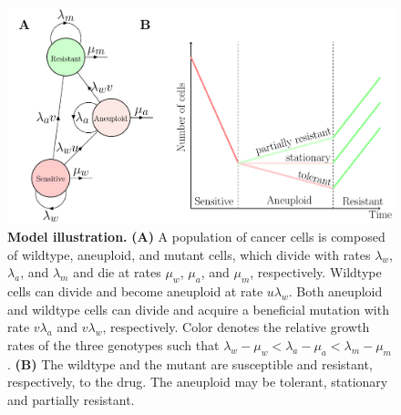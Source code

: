 \documentclass[12pt]{extarticle}
\begin{document}

\begin{figure}
\centering
\includegraphics[width=\textwidth]{Figures/figureAneuploidy.pdf}
\caption{
\textbf{Model illustration.}
\textbf{(A)} A population of cancer cells is composed of wildtype, aneuploid, and mutant cells, which divide with rates $\lambda_w$, $\lambda_a$, and $\lambda_m$ and die at rates $\mu_w$, $\mu_a$, and $\mu_m$, respectively. 
Wildtype cells can divide and become aneuploid at rate $u\lambda_w$. Both aneuploid and wildtype cells can divide and acquire a beneficial mutation with rate $v\lambda_a$ and $v\lambda_w$, respectively. Color denotes the relative growth rates of the three genotypes such that $\lambda_w - \mu_w < \lambda_a - \mu_a < \lambda_m - \mu_m$. \textbf{(B)} The wildtype and the mutant are susceptible and resistant, respectively, to the drug. The aneuploid may be tolerant, stationary and partially resistant.
}
\label{figureAneuploidy}
\end{figure}
\end{document}
